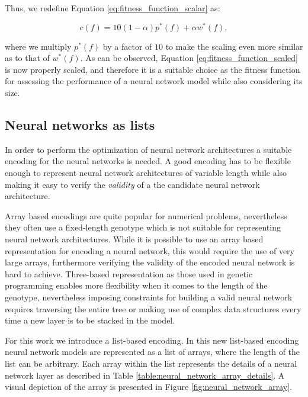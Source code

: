 \documentclass[journal]{IEEEtran}
\begin{document}
Thus, we redefine Equation \ref{eq:fitness_function_scalar} as:

\begin{equation}
c(f) = 10(1-\alpha)p^*(f) + \alpha w^*(f), 
\label{eq:fitness_function_scaled}
\end{equation}

where we multiply $p^*(f)$ by a factor of $10$ to make the scaling even more similar as to that of $w^*(f)$. As can be observed, Equation \ref{eq:fitness_function_scaled} is now properly scaled, and therefore it is a suitable choice as the fitness function for assessing the performance of a neural network model while also considering its size.


\subsection{Neural networks as lists}
\label{sec:encoding_nn}

In order to perform the optimization of neural network architectures a suitable encoding for the neural networks is needed. A good encoding has to be flexible enough to represent neural network architectures of variable length while also making it easy to verify the \textit{validity} of a the candidate neural network architecture. 

Array based encodings are quite popular for numerical problems, nevertheless they often use a fixed-length genotype which is not suitable for representing neural network architectures. While it is possible to use an array based representation for encoding a neural network, this would require the use of very large arrays, furthermore verifying the validity of the encoded neural network is hard to achieve. Three-based representation as those used in genetic programming \cite{Engelbrecht2007} enables more flexibility when it comes to the length of the genotype, nevertheless imposing constraints for building a valid neural network requires traversing the entire tree or making use of complex data structures every time a new layer is to be stacked in the model. 

For this work we introduce a list-based encoding. In this new list-based encoding neural network models are represented as a list of arrays, where the length of the list can be arbitrary. Each array within the list represents the details of a neural network layer as described in Table \ref{table:neural_network_array_details}. A visual depiction of the array is presented in Figure \ref{fig:neural_network_array}.
\end{document}
